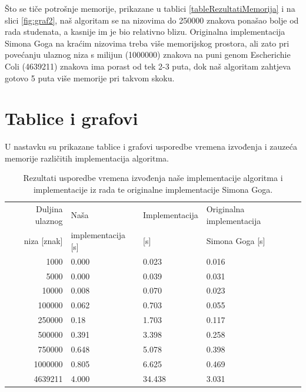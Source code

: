 \documentclass[times, utf8, seminar]{fer}
\begin{document}
Što se tiče potrošnje memorije, prikazane u tablici \ref{tableRezultatiMemorija} i na slici \ref{fig:graf2}, naš algoritam se na nizovima do 250000 znakova ponašao bolje od rada studenata, a kasnije im je bio relativno blizu. Originalna implementacija Simona Goga na kraćim nizovima treba više memorijskog prostora, ali zato pri povećanju ulaznog niza s milijun (1000000) znakova na puni genom Escherichie Coli (4639211) znakova ima porast od tek 2-3 puta, dok naš algoritam zahtjeva gotovo 5 puta više memorije pri takvom skoku.

\section{Tablice i grafovi}
 U nastavku su prikazane tablice i grafovi usporedbe vremena izvođenja i zauzeća memorije različitih implementacija algoritma.
\begin{table}
\caption{Rezultati usporedbe vremena izvođenja naše implementacije algoritma i implementacije iz rada \cite{studenti2016} te originalne implementacije Simona Goga.}
\label{tableRezultatiVrijeme}
\begin{center}
\begin{tabular}{rlll}
\toprule
Duljina ulaznog & Naša & Implementacija & Originalna implementacija \\
niza   [znak] & implementacija [s] & \cite{studenti2016} [s] &  Simona Goga [s]\\
\midrule
1000 & 0.000 & 0.023 & 0.016\\
5000 & 0.000 &  0.039 & 0.031 \\
10000 & 0.008 & 0.070 & 0.023 \\
100000 & 0.062 & 0.703 & 0.055 \\
250000 & 0.18 & 1.703 & 0.117 \\
500000 & 0.391 & 3.398 & 0.258\\
750000 & 0.648 & 5.078 & 0.398\\
1000000 & 0.805 & 6.625 & 0.469 \\
4639211 & 4.000 & 34.438 & 3.031\\
\bottomrule
\end{tabular}
\end{center}
\end{table}
\end{document}
